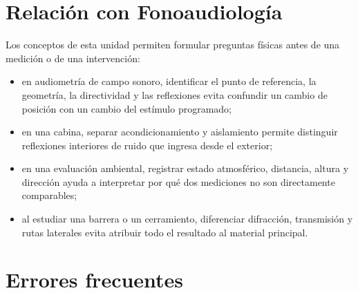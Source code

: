 \section{Relación con Fonoaudiología}
\label{sec:u9-fonoaudiologia}

Los conceptos de esta unidad permiten formular preguntas físicas antes de una
medición o de una intervención:

\begin{itemize}
    \item en audiometría de campo sonoro, identificar el punto de referencia,
    la geometría, la directividad y las reflexiones evita confundir un cambio
    de posición con un cambio del estímulo programado;
    \item en una cabina, separar acondicionamiento y aislamiento permite
    distinguir reflexiones interiores de ruido que ingresa desde el exterior;
    \item en una evaluación ambiental, registrar estado atmosférico, distancia,
    altura y dirección ayuda a interpretar por qué dos mediciones no son
    directamente comparables;
    \item al estudiar una barrera o un cerramiento, diferenciar difracción,
    transmisión y rutas laterales evita atribuir todo el resultado al material
    principal.
\end{itemize}


\section{Errores frecuentes}
\label{sec:u9-errores}

